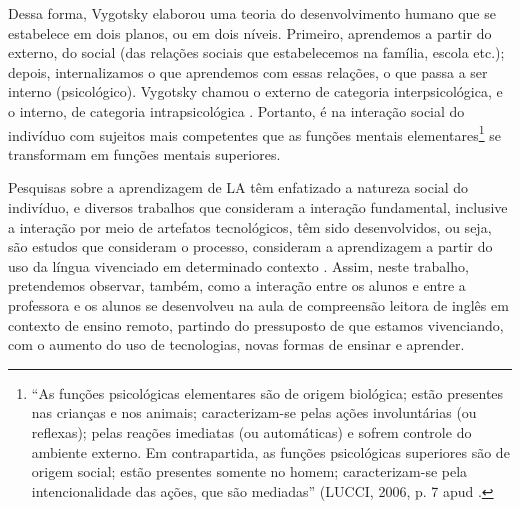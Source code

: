 \documentclass{textolivre}
\begin{document}
Dessa forma, Vygotsky elaborou uma teoria do desenvolvimento humano que se estabelece em dois planos, ou em dois níveis. Primeiro, aprendemos a partir do externo, do social (das relações sociais que estabelecemos na família, escola etc.); depois, internalizamos o que aprendemos com essas relações, o que passa a ser interno (psicológico). Vygotsky chamou o externo de categoria interpsicológica, e o interno, de categoria intrapsicológica \cite{figueiredo2019}. Portanto, é na interação social do indivíduo com sujeitos mais competentes que as funções mentais elementares\footnote{“As funções psicológicas elementares são de origem biológica; estão presentes nas crianças e nos animais; caracterizam-se pelas ações involuntárias (ou reflexas); pelas reações imediatas (ou automáticas) e sofrem controle do ambiente externo. Em contrapartida, as funções psicológicas superiores são de origem social; estão presentes somente no homem; caracterizam-se pela intencionalidade das ações, que são mediadas” (LUCCI, 2006, p. 7 apud \textcite[p. 12]{figueiredo2019}.} se transformam em funções mentais superiores.

Pesquisas sobre a aprendizagem de LA têm enfatizado a natureza social do indivíduo, e diversos trabalhos que consideram a interação fundamental, inclusive a interação por meio de artefatos tecnológicos, têm sido desenvolvidos, ou seja, são estudos que consideram o processo, consideram a aprendizagem a partir do uso da língua vivenciado em determinado contexto \cite{fett2005, figueiredo2019}. Assim, neste trabalho, pretendemos observar, também, como a interação entre os alunos e entre a professora e os alunos se desenvolveu na aula de compreensão leitora de inglês em contexto de ensino remoto, partindo do pressuposto de que estamos vivenciando, com o aumento do uso de tecnologias, novas formas de ensinar e aprender.
\end{document}
